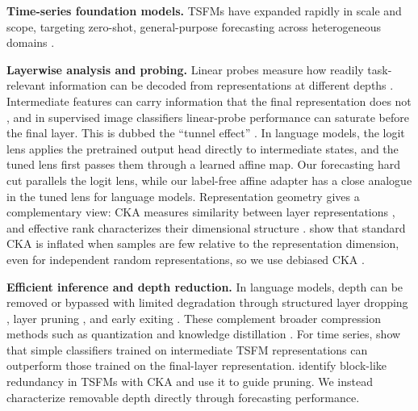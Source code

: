 \documentclass{article} %
\begin{document}
\textbf{Time-series foundation models.}
TSFMs have expanded rapidly in scale and scope, targeting zero-shot, general-purpose forecasting
across heterogeneous domains \citep{ansari2024chronoslearninglanguagetime,
das2024decoderonlyfoundationmodeltimeseries, woo2024unifiedtraininguniversaltime,
ansari2025chronos2univariateuniversalforecasting, auer2025tirexzeroshotforecastinglong}.

\textbf{Layerwise analysis and probing.}
Linear probes measure how readily task-relevant information can be decoded from representations at different depths \citep{alain2018understandingintermediatelayersusing}. Intermediate features can carry information that the final representation does not \citep{evci2022head2toeutilizingintermediaterepresentations}, and in supervised image classifiers linear-probe performance can saturate before the final layer. This is dubbed the ``tunnel effect'' \citep{masarczyk2023tunneleffectbuildingdata}. In language models, the logit lens \citep{nostalgebraist2020logitlens} applies the pretrained output head directly to intermediate states, and the tuned lens \citep{belrose2025elicitinglatentpredictionstransformers} first passes them through a learned affine map. Our forecasting hard cut parallels the logit lens, while our label-free affine adapter has a close analogue in the tuned lens for language models. Representation geometry gives a complementary view: CKA measures similarity between layer representations \citep{kornblith2019similarityneuralnetworkrepresentations, cortes2024algorithmslearningkernelsbased}, and effective rank characterizes their dimensional structure \citep{garrido2023rankmeassessingdownstreamperformance,
skean2025layerlayeruncoveringhidden}. \citet{murphy2024correctingbiasedcenteredkernel} show that standard CKA is inflated when samples are few relative to the representation dimension, even for independent random representations, so we use debiased CKA \citep{JMLR:v13:song12a}.

\textbf{Efficient inference and depth reduction.}
In language models, depth can be removed or bypassed with limited degradation through structured layer dropping \citep{fan2019reducingtransformerdepthdemand}, layer pruning \citep{men2024shortgptlayerslargelanguage, gromov2025unreasonableineffectivenessdeeperlayers}, and early exiting \citep{teerapittayanon2017branchynetfastinferenceearly,
schwartz2020righttooljobmatching, Elhoushi_2024}. These complement broader compression methods such as quantization \citep{frantar2023gptqaccurateposttrainingquantization} and knowledge distillation \citep{hinton2015distillingknowledgeneuralnetwork,
sanh2020distilbertdistilledversionbert}. For time series, \citet{feofanov2026mantisv2closingzeroshotgap} show that simple classifiers trained on intermediate TSFM representations can outperform those trained on the final-layer representation.
\citet{wiliński2025exploringrepresentationsinterventionstime} identify block-like redundancy in TSFMs with CKA and use it to guide pruning.  We instead characterize removable depth directly through forecasting performance.
\end{document}
